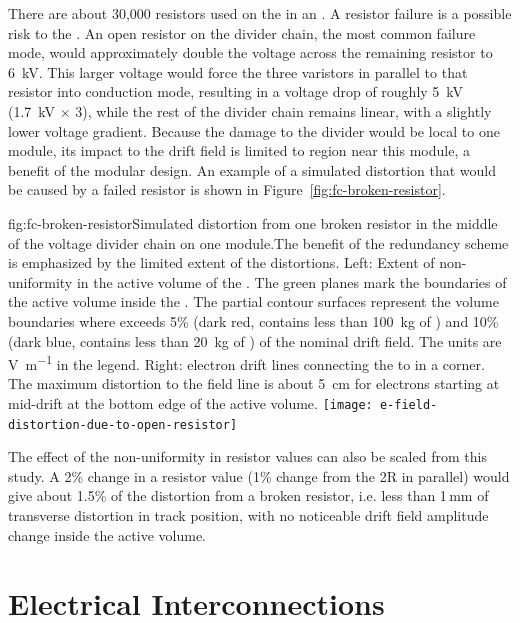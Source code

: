 There are about 30,000 resistors used on the  in an . A resistor failure is a possible risk to the .  
An open resistor on the divider chain, the most common failure mode, would approximately double the voltage across the remaining resistor to \SI{6}{kV}.  This larger voltage would force the three varistors in parallel to that resistor into conduction mode, resulting in a voltage drop of roughly \SI{5}{kV} (\SI{1.7}{kV} $\times$ \num{3}), while the rest of the divider chain remains linear, with a slightly lower voltage gradient. 
Because the damage to the divider would be local to one module, its impact to the  drift field is limited to region near this module, a benefit of the modular  design.
An example of a simulated \efield{} distortion that would be caused by a failed resistor is shown in Figure~\ref{fig:fc-broken-resistor}. 

\begin{dunefigure}{fig:fc-broken-resistor}{Simulated \efield{} distortion from one broken resistor in the middle of the voltage divider chain on one  module.The benefit of the redundancy scheme is emphasized by the limited extent of the \efield distortions. Left: Extent of \efield{} non-uniformity in the active volume of the . The green planes mark the boundaries of the active volume inside the . The partial contour surfaces represent the volume boundaries where \efield{} exceeds 5\% (dark red, contains less than \SI{100}{kg} of ) and 10\% (dark blue, contains less than \SI{20}{kg} of ) of the nominal drift field. The units are \si{\volt\per\m} in the legend. Right: electron drift lines connecting the  to  in a %
 corner.  The maximum distortion to the field line is about \SI{5}{cm} for electrons starting at mid-drift at the bottom edge of the active volume.}
\texttt{[image: e-field-distortion-due-to-open-resistor]}
\end{dunefigure}
The effect of the non-uniformity in resistor values can also be scaled from this study.  A 2\% change in a resistor value (1\% change from the 2R in parallel) would give about 1.5\% of the distortion from a broken resistor, i.e. less than 1\,mm of transverse distortion in track position, with no noticeable drift field amplitude change inside the active volume.
 
\section{Electrical Interconnections} %
\label{sec:fdsp-hv-design-interconnect}

